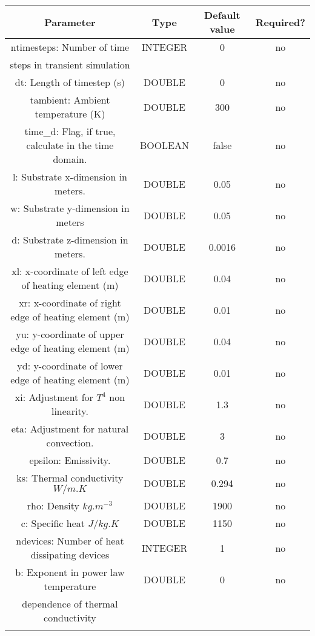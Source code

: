 \documentclass{article}
\begin{document}
\begin{table}[H]
\begin{tabular}{|c|c|c|c|}
\hline
Parameter&Type&Default value&Required?\\
\hline
ntimesteps: Number of time & INTEGER & 0 & no \\
steps in transient simulation & & & \\
\hline
dt: Length of timestep (s) & DOUBLE & 0 & no \\
\hline tambient: Ambient temperature (K) & DOUBLE & 300 & no \\
\hline time\_d: Flag, if true, calculate in the time domain. & BOOLEAN & false & no \\
\hline l: Substrate x-dimension in meters. & DOUBLE & 0.05 & no \\
\hline w: Substrate y-dimension in meters & DOUBLE & 0.05 & no \\
\hline d: Substrate z-dimension in meters. & DOUBLE & 0.0016 & no \\
\hline xl: x-coordinate of left edge of heating element (m) & DOUBLE & 0.04 & no \\
\hline xr: x-coordinate of right edge of heating element (m) & DOUBLE & 0.01 & no \\
\hline yu: y-coordinate of upper edge of heating element (m) & DOUBLE & 0.04 & no \\
\hline yd: y-coordinate of lower edge of heating element (m) & DOUBLE & 0.01 & no \\
\hline xi: Adjustment for $T^4$ non linearity. & DOUBLE & 1.3 & no \\
\hline eta: Adjustment for natural convection. & DOUBLE & 3 & no \\
\hline epsilon: Emissivity. & DOUBLE & 0.7 & no \\
\hline ks: Thermal conductivity {$W/{m.K}$} & DOUBLE & 0.294 & no \\
\hline rho: Density {$kg.{m^{-3}}$} & DOUBLE & 1900 & no \\
\hline c: Specific heat {$J/{kg.K}$} & DOUBLE & 1150 & no \\
\hline ndevices: Number of heat dissipating devices & INTEGER & 1 & no \\
\hline b: Exponent in power law temperature & DOUBLE & 0 & no \\
dependence of thermal conductivity & & & \\
\par
\hline
\end{tabular}
\end{table}
\end{document}
